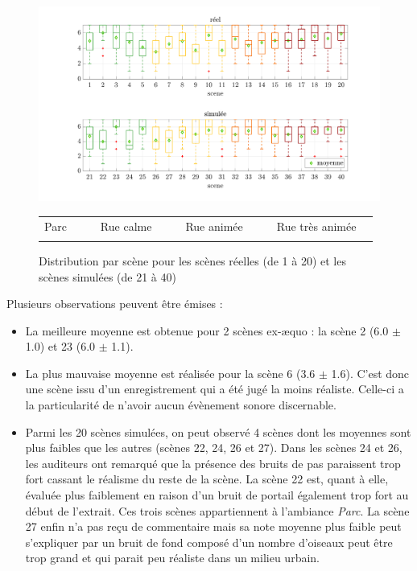 \begin{figure}[h]
\centering
\includegraphics[width=.9\textwidth]{./figures/test_perceptif/testPerceptif_meanPerSceneCOLOR.pdf}

\begin{tabular}{|p{1.5cm}|l|p{0.001cm}|p{2cm}|l|p{0.001cm}|p{2cm}|l|p{0.001cm}|p{2.75cm}|l|}
\hhline{|-|-|~|-|-|~|-|-|~|-|-|}
Parc & {\cellcolor[HTML]{5AB25A}} & & Rue calme & {\cellcolor[HTML]{FFCB2F}} & & Rue animée & {\cellcolor[HTML]{F56B00}} & &  Rue très animée & {\cellcolor[HTML]{9A0000}}\\
\hhline{|-|-|~|-|-|~|-|-|~|-|-|}
\end{tabular}

\caption{Distribution par scène pour les scènes réelles (de 1 à 20) et les scènes simulées (de 21 à 40)}
\label{fig:moyParScene}
\end{figure}


Plusieurs observations peuvent être émises : 
\begin{itemize}
\item La meilleure moyenne est obtenue pour 2 scènes ex-æquo : la scène 2 (6.0 $\pm$ 1.0) et 23 (6.0 $\pm$ 1.1).
\item La plus mauvaise moyenne est réalisée pour la scène 6 (3.6 $\pm$ 1.6). C'est donc une scène issu d'un enregistrement qui a été jugé la moins réaliste. Celle-ci a la particularité de n'avoir aucun évènement sonore discernable. 
\item Parmi les 20 scènes simulées, on peut observé 4 scènes dont les moyennes sont plus faibles que les autres (scènes 22, 24, 26 et 27). Dans les scènes 24 et 26, les auditeurs ont remarqué que la présence des bruits de pas paraissent trop fort cassant le réalisme du reste de la scène. La scène 22 est, quant à elle, évaluée plus faiblement en raison d'un bruit de portail également trop fort au début de l'extrait. Ces trois scènes appartiennent à l'ambiance \textit{Parc}. La scène 27 enfin n'a pas reçu de commentaire mais sa note moyenne plus faible peut s'expliquer par un bruit de fond composé d'un nombre d'oiseaux peut être trop grand et qui parait peu réaliste dans un milieu urbain.\\
\end{itemize}

